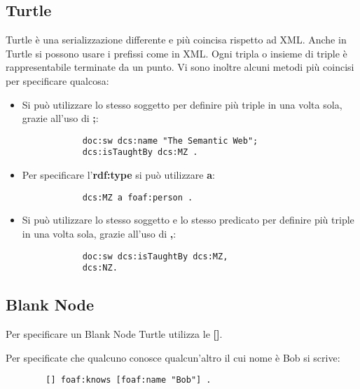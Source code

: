 \subsection{Turtle}
Turtle è una serializzazione differente e più coincisa rispetto ad XML. Anche in Turtle si possono usare i prefissi come in XML. Ogni tripla o insieme di triple è rappresentabile terminate da un punto. Vi sono inoltre alcuni metodi più coincisi per specificare qualcosa:
\begin{itemize}
	\item Si può utilizzare lo stesso soggetto per definire più triple in una volta sola, grazie all'uso di \textbf{;}:
	\begin{info}[Esempio]
		\begin{verbatim}
			doc:sw dcs:name "The Semantic Web"; 
			dcs:isTaughtBy dcs:MZ .
		\end{verbatim}
	\end{info}
	\item Per specificare l'\textbf{rdf:type} si può utilizzare \textbf{a}:
	\begin{info}[Esempio]
		\begin{verbatim}
			dcs:MZ a foaf:person .
		\end{verbatim}
	\end{info}
	\item Si può utilizzare lo stesso soggetto e lo stesso predicato per definire più triple in una volta sola, grazie all'uso di \textbf{,}:
	\begin{info}[Esempio]
		\begin{verbatim}
			doc:sw dcs:isTaughtBy dcs:MZ,
			dcs:NZ.
		\end{verbatim}
	\end{info}
\end{itemize}

\subsection{Blank Node}
Per specificare un Blank Node Turtle utilizza le \textbf{[]}.
\begin{info}[Esempio]
	Per specificate che qualcuno conosce qualcun'altro il cui nome è Bob si scrive:
	\begin{verbatim}
		[] foaf:knows [foaf:name "Bob"] .
	\end{verbatim}
\end{info}
\newpage
